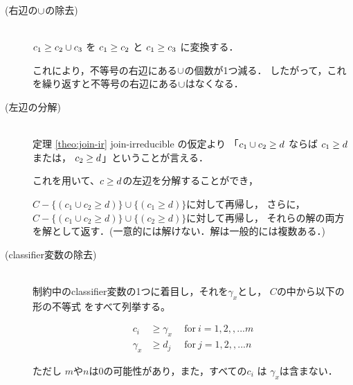 \begin{description}
\item[(右辺の$\cup$の除去)]\mbox{}\\
  ${c_1} \ge {c_2 \cup c_3}$ を
  ${c_1} \ge {c_2}$ と
  ${c_1} \ge {c_3}$ に変換する．

  これにより，不等号の右辺にある$\cup$の個数が1つ減る．
  したがって，これを繰り返すと不等号の右辺にある$\cup$はなくなる．



\item[(左辺の分解)] \mbox{}\\
  定理 \ref{theo:join-ir} join-irreducible の仮定より
  「${c_1 \cup c_2} \ge {d}$ ならば
  ${c_1} \ge {d}$または，
  ${c_2} \ge {d}$」ということが言える．

  これを用いて、${c} \ge {d}$の左辺を分解することができ，

  $C - \{(c_1 \cup c_2 \ge d)\} \cup \{(c_1 \ge d)\}$に対して再帰し，
  さらに，
  $C - \{(c_1 \cup c_2 \ge d)\} \cup \{(c_2 \ge d)\}$に対して再帰し，
  それらの解の両方を解として返す．(一意的には解けない．解は一般的には複数ある．)




\item[(classifier変数の除去)]\mbox{}\\
  制約中のclassifier変数の1つに着目し，それを$\gamma_x$とし，
  $C$の中から以下の形の不等式
  をすべて列挙する。

  \begin{align*}
    c_i & \ge \gamma_x  ~~ & \text{for}~ i=1,2,,...m\\
    \gamma_x & \ge d_j  ~~ & \text{for}~ j=1,2,,...n
  \end{align*}

  ただし $m$や$n$は$0$の可能性があり，また，すべての$c_i$ は $\gamma_x$は含まない．


\end{description}
